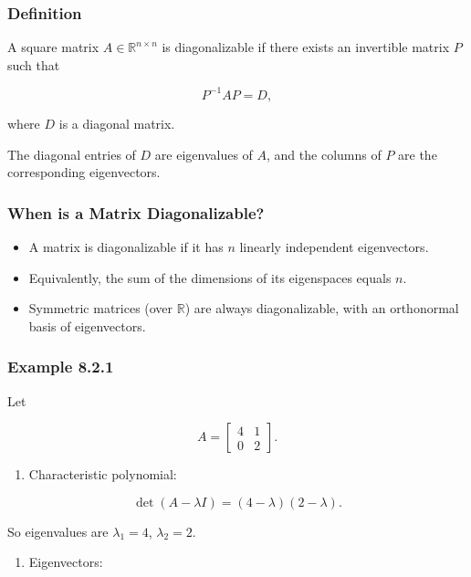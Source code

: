 \documentclass[
  12pt,
  a4paper,
]{article}
\begin{document}
\subsubsection{Definition}\label{definition-6}

A square matrix \(A \in \mathbb{R}^{n \times n}\) is diagonalizable if
there exists an invertible matrix \(P\) such that

\[P^{-1} A P = D,\]

where \(D\) is a diagonal matrix.

The diagonal entries of \(D\) are eigenvalues of \(A\), and the columns
of \(P\) are the corresponding eigenvectors.

\subsubsection{When is a Matrix
Diagonalizable?}\label{when-is-a-matrix-diagonalizable}

\begin{itemize}
\item
  A matrix is diagonalizable if it has \(n\) linearly independent
  eigenvectors.
\item
  Equivalently, the sum of the dimensions of its eigenspaces equals
  \(n\).
\item
  Symmetric matrices (over \(\mathbb{R}\)) are always diagonalizable,
  with an orthonormal basis of eigenvectors.
\end{itemize}

\subsubsection{Example 8.2.1}\label{example-821}

Let

\[A = \begin{bmatrix} 4 & 1 \\ 0 & 2 \end{bmatrix}.\]

\begin{enumerate}
\def\labelenumi{\arabic{enumi}.}
\item
  Characteristic polynomial:
\end{enumerate}

\[\det(A - \lambda I) = (4-\lambda)(2-\lambda).\]

So eigenvalues are \(\lambda_1 = 4\), \(\lambda_2 = 2\).

\begin{enumerate}
\def\labelenumi{\arabic{enumi}.}
\item
  Eigenvectors:
\end{enumerate}
\end{document}
